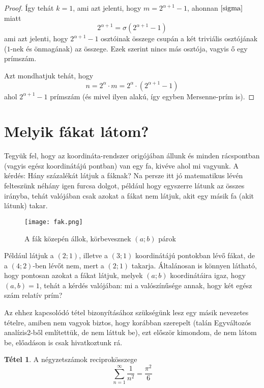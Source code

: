 \documentclass[12pt]{book}
\theoremstyle{plain} %
\theoremstyle{definition} %
\newtheorem{theo/}{Tétel}[section]
\newenvironment{theo}
  {\renewcommand{\qedsymbol}{$\clubsuit$}%
   \pushQED{\qed}\begin{theo/}}
  {\popQED\end{theo/}}
\theoremstyle{remark}
\renewcommand\qedsymbol{$\blacksquare$}
\numberwithin{equation}{section}  %
\begin{document}
\begin{proof}
		Így tehát $k=1$, ami azt jelenti, hogy $m=2^{\alpha+1}-1$, ahonnan $\ref{sigma}$ miatt
		\[ 2^{\alpha+1} = \sigma(2^{\alpha+1}-1)  \]
		ami azt jelenti, hogy $2^{\alpha+1}-1$ osztóinak összege csupán a két triviális osztójának ($1$-nek és önmagának) az összege. Ezek szerint nincs más osztója, vagyis ő egy prímszám.
		
		Azt mondhatjuk tehát, hogy
		\[ n = 2^{\alpha} \cdot m = 2^{\alpha} \cdot (2^{\alpha+1} - 1)  \]
		ahol $2^{\alpha+1}-1$ prímszám (és mivel ilyen alakú, így egyben Mersenne-prím is).	
	\end{proof}
	
	
	\section{Melyik fákat látom?}
	
	Tegyük fel, hogy az koordináta-rendszer origójában állunk és minden rácspontban (vagyis egész koordinátájú pontban) van egy fa, kivéve ahol mi vagyunk. A kérdés: Hány százalékát látjuk a fáknak? Na persze itt jó matematikus lévén felteszünk néhány igen furcsa dolgot, például hogy egyszerre látunk az összes irányba, tehát valójában csak azokat a fákat nem látjuk, akit egy másik fa (akit látunk) takar.
	
	\begin{figure}[h] %
		\centering
		\texttt{[image: fak.png]}
		\caption{A fák közepén állok, körbevesznek $(a;b)$ párok}\label{fak}
	\end{figure}

	Például látjuk a $(2;1)$, illetve a $(3;1)$ koordinátájú pontokban lévő fákat, de a $(4;2)$-ben lévőt nem, mert a $(2;1)$ takarja. Általánosan is könnyen látható, hogy pontosan azokat a fákat látjuk, melyek $(a;b)$ koordinátáira igaz, hogy $(a,b)=1$, tehát a kérdés valójában: mi a valószínűsége annak, hogy két egész szám relatív prím?
	
	Az ehhez kapcsolódó tétel bizonyításához szükségünk lesz egy másik nevezetes tételre, amiben nem vagyok biztos, hogy korábban szerepelt (talán Egyváltozós analízis2-ből említettük, de nem láttuk be), ezt először kimondom, de nem látom be, előadáson is csak hivatkoztunk rá.
	
	\begin{theo}
		A négyzetszámok reciprokösszege
		\[ \sum\limits_{n = 1}^{\infty} \dfrac{1}{n^2} =   \dfrac{\pi^2}{6} \]
	\end{theo}
\end{document}
